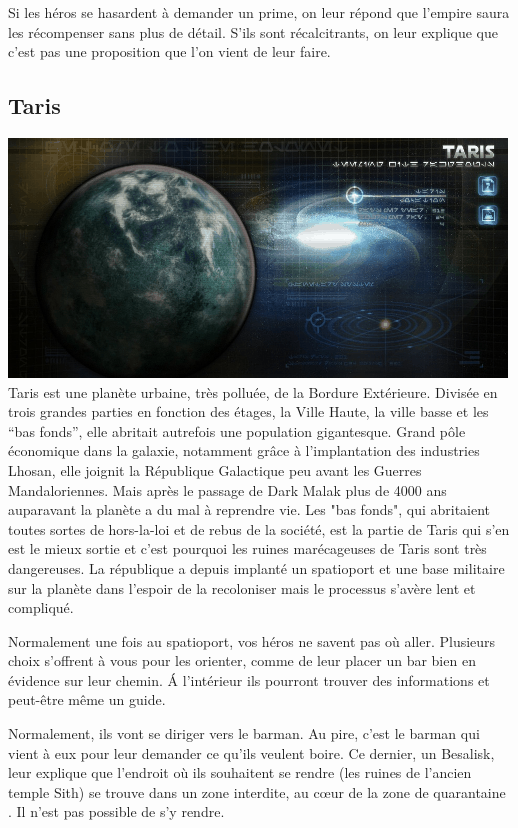 Si les héros se hasardent à demander un prime, on leur répond que l’empire saura les récompenser sans plus de détail. S’ils sont récalcitrants, on leur explique que c’est pas une proposition que l’on vient de leur faire.


\subsection{Taris} \label{sec:taris}
\noindent\includegraphics[width=\linewidth]{_img/dos-au-muur/taris.png}
Taris est une planète urbaine, très polluée, de la Bordure Extérieure. Divisée en trois grandes parties en fonction des étages, la Ville Haute, la ville basse et les “bas fonds”, elle abritait autrefois une population gigantesque. Grand pôle économique dans la galaxie, notamment grâce à l’implantation des industries Lhosan, elle joignit la République Galactique peu avant les Guerres Mandaloriennes. Mais après le passage de Dark Malak plus de 4000 ans auparavant la planète a du mal à reprendre vie. Les "bas fonds", qui abritaient toutes sortes de hors-la-loi et de rebus de la société, est la partie de Taris qui s’en est le mieux sortie et c’est pourquoi les ruines marécageuses de Taris sont très dangereuses. La république a depuis implanté un spatioport et une base militaire sur la planète dans l’espoir de la recoloniser mais le processus s’avère lent et compliqué.

Normalement une fois au spatioport, vos héros ne savent pas où aller. Plusieurs choix s’offrent à vous pour les orienter, comme de leur placer un bar bien en évidence sur leur chemin. \'A l’intérieur ils pourront trouver des informations et peut-être même un guide.

Normalement, ils vont se diriger vers le barman. Au pire, c’est le barman qui vient à eux pour leur demander ce qu’ils veulent boire. Ce dernier, un Besalisk, leur explique que l’endroit où ils souhaitent se rendre (les ruines de l’ancien temple Sith) se trouve dans un zone interdite, au c\oe{ur} de la zone de quarantaine . Il n’est pas possible de s’y rendre.

